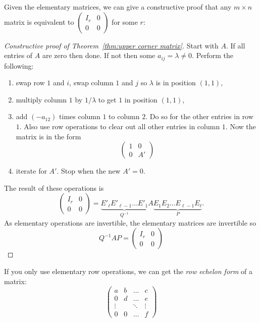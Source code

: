 \documentclass[a4paper]{article}
\theoremstyle{definition}
\begin{document}
Given the elementary matrices, we can give a constructive proof that any \(m\times n\) matrix is equivalent to \(\begin{pmatrix} I_r & 0 \\ 0 & 0 \end{pmatrix}\) for some \(r\):

\begin{proof}[Constructive proof of Theorem~\ref{thm:upper corner matrix}]
  Start with \(A\). If all entries of \(A\) are zero then done. If not then some \(a_{ij} = \lambda \neq 0\). Perform the following:
  \begin{enumerate}
  \item swap row \(1\) and \(i\), swap column \(1\) and \(j\) so \(\lambda\) is in position \((1,1)\),
  \item multiply column \(1\) by \(1/\lambda\) to get \(1\) in position \((1,1)\),
  \item add \((-a_{12})\) times column \(1\) to column \(2\). Do so for the other entries in row \(1\). Also use row operations to clear out all other entries in column \(1\). Now the matrix is in the form
    \[
      \begin{pmatrix}
        1 & 0 \\
        0 & A'
      \end{pmatrix}
    \]
  \item iterate for \(A'\). Stop when the new \(A' = 0\).
  \end{enumerate}
  The result of these operations is
  \[
    \begin{pmatrix}
      I_r & 0 \\
      0 & 0
    \end{pmatrix}
    =\underbrace{E'_{\ell}E'_{\ell-1}\dots E'_1}_{Q^{-1}} A \underbrace{E_1E_2\dots E_{\ell-1}E_\ell}_{P}.
  \]
  As elementary operations are invertible, the elementary matrices are invertible so
  \[
    Q^{-1}AP = 
     \begin{pmatrix}
      I_r & 0 \\
      0 & 0
    \end{pmatrix}
  \]
\end{proof}

If you only use elementary row operations, we can get the \emph{row echelon form} of a matrix:
\[
  \begin{pmatrix}
    a & b & \dots & c \\
    0 & d & \dots & e \\
    \vdots & & \ddots & \vdots \\
    0 & 0 & \dots & f
  \end{pmatrix}
\]
\end{document}
